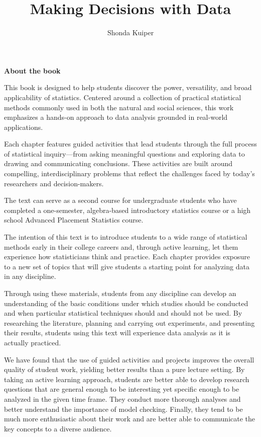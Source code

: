 \documentclass[
]{report}
\title{Making Decisions with Data}
\author{Shonda Kuiper}
\date{}
\begin{document}
\maketitle

{
\setcounter{tocdepth}{1}
\tableofcontents
}
\newpage

\textbf{About the book}

This book is designed to help students discover the power, versatility, and broad applicability of statistics. Centered around a collection of practical statistical methods commonly used in both the natural and social sciences, this work emphasizes a hands-on approach to data analysis grounded in real-world applications.

Each chapter features guided activities that lead students through the full process of statistical inquiry---from asking meaningful questions and exploring data to drawing and communicating conclusions. These activities are built around compelling, interdisciplinary problems that reflect the challenges faced by today's researchers and decision-makers.

The text can serve as a second course for undergraduate students who have completed a one-semester, algebra-based introductory statistics course or a high school Advanced Placement Statistics course.

The intention of this text is to introduce students to a wide range of statistical methods early in their college careers and, through active learning, let them experience how statisticians think and practice. Each chapter provides exposure to a new set of topics that will give students a starting point for analyzing data in any discipline.

Through using these materials, students from any discipline can develop an understanding of the basic conditions under which studies should be conducted and when particular statistical techniques should and should not be used. By researching the literature, planning and carrying out experiments, and presenting their results, students using this text will experience data analysis as it is actually practiced.

We have found that the use of guided activities and projects improves the overall quality of student work, yielding better results than a pure lecture setting. By taking an active learning approach, students are better able to develop research questions that are general enough to be interesting yet specific enough to be analyzed in the given time frame. They conduct more thorough analyses and better understand the importance of model checking. Finally, they tend to be much more enthusiastic about their work and are better able to communicate the key concepts to a diverse audience.
\end{document}
